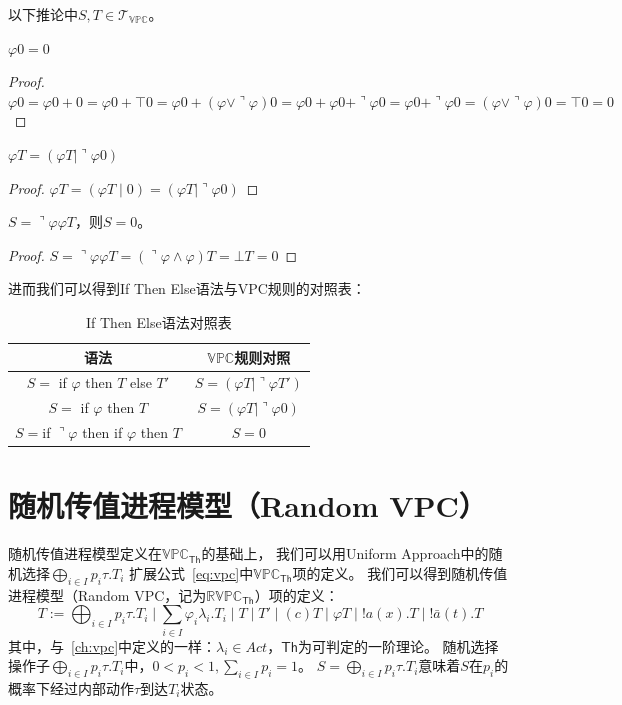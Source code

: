 以下推论中$S,T\in \mathcal{T}_{\mathbb{VPC}}$。
\begin{corollary} 
   $\varphi 0 = 0$
\end{corollary}
\begin{proof}
   $\varphi 0 = \varphi 0 + 0 = \varphi 0 + \top 0 = \varphi 0 + (\varphi \vee \urcorner \varphi)0 = \varphi 0 + \varphi 0 + \urcorner \varphi 0 = \varphi 0 + \urcorner \varphi 0 = (\varphi \vee \urcorner \varphi)0 = \top 0 = 0$
\end{proof}
\begin{corollary}
   $\varphi T = (\varphi T\mid \urcorner \varphi 0)$
\end{corollary}
\begin{proof}
   $\varphi T = (\varphi T\mid 0) = (\varphi T\mid \urcorner \varphi 0)$
\end{proof}
\begin{corollary}
   $S=\urcorner\varphi \varphi T$，则$S=0$。
\end{corollary}
\begin{proof}
   $S=\urcorner\varphi \varphi T = (\urcorner\varphi\wedge\varphi)T=\bot T=0$
\end{proof}
进而我们可以得到If Then Else语法与VPC规则的对照表：
\begin{table}[!hpt]
   \caption[If Then Else语法对照表]{If Then Else语法对照表\footnotemark}
   \label{tab:ifthenelse}
   \centering
   \begin{tabular}{@{}cc@{}} \toprule
     语法 & $\mathbb{VPC}$规则对照 \\ \midrule
     $S=$ if $\varphi$ then $T$ else $T'$& $S=(\varphi T|\urcorner \varphi T')$\\
     $S=$ if $\varphi$ then $T$ & $S=(\varphi T|\urcorner\varphi 0)$\\
     $S = $if $\urcorner \varphi$ then if $\varphi$ then $T$ & $S=0$\\ \bottomrule
   \end{tabular}
 \end{table}

\section{随机传值进程模型（Random VPC）}
随机传值进程模型定义在$\mathbb{VPC}_{\mathsf{Th}}$的基础上，
我们可以用Uniform Approach中的随机选择$\bigoplus_{i\in I}p_i\tau.T_i$
扩展公式~\ref{eq:vpc}中$\mathbb{VPC}_{\mathsf{Th}}$项的定义。
我们可以得到随机传值进程模型（Random VPC，记为$\mathbb{RVPC}_{\mathsf{Th}}$）项的定义：
\begin{equation}\label{eq:rvpc}
   T:=\bigoplus_{i\in I}p_i \tau.T_i\mid \sum_{i\in I} \varphi_i\lambda_i.T_i\mid T \mid T'\mid (c)T\mid \varphi T\mid !a(x).T \mid !\bar{a}(t).T
\end{equation}
其中，与~\ref{ch:vpc}中定义的一样：$\lambda_i \in Act$，$\mathsf{Th}$为可判定的一阶理论。
随机选择操作子$\bigoplus_{i\in I}p_i\tau.T_i$中，$0<p_i<1, \sum_{i\in I}p_i = 1$。
$S=\bigoplus_{i\in I}p_i\tau.T_i$意味着$S$在$p_i$的概率下经过内部动作$\tau$到达$T_i$状态。

